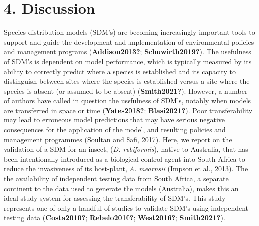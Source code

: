 \documentclass[12pt,]{article}
\begin{document}
\hypertarget{discussion}{%
\section{4. Discussion}\label{discussion}}

Species distribution models (SDM's) are becoming increasingly important
tools to support and guide the development and implementation of
environmental policies and management programs (\textbf{Addison2013?};
\textbf{Schuwirth2019?}). The usefulness of SDM's is dependent on model
performance, which is typically measured by its ability to correctly
predict where a species is established and its capacity to distinguish
between sites where the species is established versus a site where the
species is absent (or assumed to be absent) (\textbf{Smith2021?}).
However, a number of authors have called in question the usefulness of
SDM's, notably when models are transferred in space or time
(\textbf{Yates2018?}; \textbf{Blasi2021?}). Poor transferability may
lead to erroneous model predictions that may have serious negative
consequences for the application of the model, and resulting policies
and management programmes (Soultan and Safi, 2017). Here, we report on
the validation of a SDM for an insect, (\emph{D. rubiformis}), native to
Australia, that has been intentionally introduced as a biological
control agent into South Africa to reduce the invasiveness of its
host-plant, \emph{A. mearnsii} (Impson et al., 2013). The the
availability of independent testing data from South Africa, a separate
continent to the data used to generate the models (Australia), makes
this an ideal study system for assessing the transferability of SDM's.
This study represents one of only a handful of studies to validate SDM's
using independent testing data (\textbf{Costa2010?};
\textbf{Rebelo2010?}; \textbf{West2016?}; \textbf{Smith2021?}).
\end{document}
